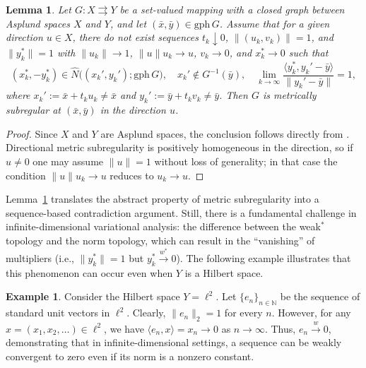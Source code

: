 \documentclass[12pt,twoside,reqno]{amsart}
\newtheorem{lemma}[theorem]{Lemma}
\theoremstyle{definition}
\newtheorem{example}[theorem]{Example}
\numberwithin{equation}{section}
\begin{document}
\begin{lemma} \label{lem:sequential_ms_characterization}
Let $G: X \rightrightarrows Y$ be a set-valued mapping with a closed graph between Asplund spaces $X$ and $Y$, and let $(\bar{x}, \bar{y}) \in \mathrm{gph}\, G$. Assume that for a given direction $u \in X$, there do not exist sequences $t_k \downarrow 0$, $\|(u_k, v_k)\| = 1$, and $\|y_k^*\| = 1$ with $\|u_k\| \to 1$, $\|u\|u_k \to u$, $v_k \to 0$, and $x_k^* \to 0$ such that
\begin{equation} \label{eq:sequential_ms_condition}
    (x_k^*, -y_k^*) \in \widehat{N}\big((x_k', y_k'); \mathrm{gph}\, G\big), \quad x_k' \notin G^{-1}(\bar{y}), \quad \lim_{k\to \infty} \frac{\langle y_k^*, y_k' - \bar{y} \rangle}{\|y_k' - \bar{y}\|} = 1,
\end{equation}
where $x_k' := \bar{x} + t_k u_k \neq \bar{x}$ and $y_k' := \bar{y} + t_k v_k \neq \bar{y}$. Then $G$ is metrically subregular at $(\bar{x}, \bar{y})$ in the direction $u$.
\end{lemma}

\begin{proof}
Since $X$ and $Y$ are Asplund spaces, the conclusion follows directly from \cite[Corollary~1, Remark 2]{gfrerer2014metric}. Directional metric subregularity is positively homogeneous in the direction, so if $u\neq 0$ one may assume $\|u\|=1$ without loss of generality; in that case the condition $\|u\| u_k \to u$ reduces to $u_k \to u$.  
\end{proof}

Lemma~\ref{lem:sequential_ms_characterization} translates the abstract property of metric subregularity into a sequence-based contradiction argument. Still, there is a fundamental challenge in infinite-dimensional variational analysis: the difference between the weak\(^*\) topology and the norm topology, which can result in the ``vanishing'' of multipliers (i.e., $\|y_k^*\|=1$ but $y_k^*\xrightarrow{w^*} 0$). The following example illustrates that this phenomenon can occur even when $Y$ is a Hilbert space. 

\begin{example}
Consider the Hilbert space $Y=\ell^2$. Let $\{e_n\}_{n \in \mathbb{N}}$ be the sequence of standard unit vectors in $\ell^2$. Clearly, $\|e_n\|_2 = 1$ for every $n$. However, for any $x = (x_1, x_2, \dots) \in \ell^2$, we have $\langle e_n, x \rangle = x_n \to 0$ as $n \to \infty$. Thus, $e_n \xrightarrow{w} 0$, demonstrating that in infinite-dimensional settings, a sequence can be weakly convergent to zero even if its norm is a nonzero constant. 
\end{example}
\end{document}
